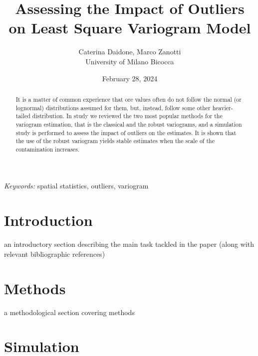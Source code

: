 \documentclass[
  12pt]{article}
\begin{document}
\def\spacingset#1{\renewcommand{\baselinestretch}%
{#1}\small\normalsize} \spacingset{1}



\date{February 28, 2024}
\title{\bf Assessing the Impact of Outliers on Least Square Variogram
Model}
\author{
Caterina Daidone, Marco Zanotti\\
University of Milano Bicocca\\
}
\maketitle

\bigskip
\bigskip
\begin{abstract}
It is a matter of common experience that ore values often do not follow
the normal (or lognormal) distributions assumed for them, but, instead,
follow some other heavier-tailed distribution. In study we reviewed the
two most popular methods for the variogram estimation, that is the
classical and the robust variograms, and a simulation study is performed
to assess the impact of outliers on the estimates. It is shown that the
use of the robust variogram yields stable estimates when the scale of
the contamination increases.
\end{abstract}

\noindent%
{\it Keywords:} spatial statistics, outliers, variogram
\vfill

\newpage
\spacingset{1.9} %

\section{Introduction}\label{introduction}

an introductory section describing the main task tackled in the paper
(along with relevant bibliographic references)

\section{Methods}\label{methods}

a methodological section covering methods

\section{Simulation}\label{simulation}
\end{document}
